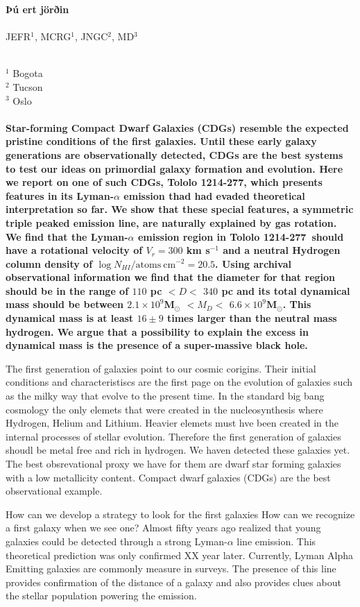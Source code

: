 \documentclass[a4paper, usenatbib, 12pt]{article}
\newcommand{\tol}{Tololo 1214-277}
\begin{document}
\pagestyle{empty}
\noindent
\textbf{Þú ert jörðin}
\\
\\
JEFR$^{1}$, MCRG$^1$, JNGC$^2$, MD$^3$
\\
\\
\scriptsize
{$^1$ Bogota
\\
$^2$ Tucson
\\
$^3$ Oslo
\normalsize
\\
\\
\textbf{
Star-forming Compact Dwarf Galaxies (CDGs) resemble the expected pristine conditions of the first galaxies.  
Until these early galaxy generations are observationally
detected, CDGs are the best systems to test our ideas on primordial
galaxy formation and evolution.  
Here we report on one of such CDGs, \tol, which presents
features in its Lyman-$\alpha$ emission thad had evaded theoretical
interpretation so far. 
We show that these special features, a symmetric triple peaked
emission line, are naturally explained by gas rotation.  
We find that the Lyman-$\alpha$ emission region in \tol\ should
have a rotational velocity of $V_{r}=300$ km s$^{-1}$ and a neutral
Hydrogen column density of $\log N_{HI} / \mathrm{atoms\ cm}^{-2} =
  20.5$.   
Using archival observational information we find that
the diameter for that region should be in the range of
$110$ pc $<D<$ $340$ pc and its total dynamical mass 
should be between $2.1\times 10^{9}$M$_{\odot}$ $<M_D<$  $6.6\times
10^{9}$M$_{\odot}$. 
This dynamical mass is at least $16\pm 9$ times
larger than the neutral mass hydrogen.
We argue that a possibility to explain the excess in
dynamical mass is the presence of a super-massive black hole. }



The first generation of galaxies point to our cosmic corigins. Their
initial conditions and characteristiscs are the first page on the
evolution of galaxies such as the milky way that evolve to the present
time. In the standard big bang cosmology the only elemets that were
created in the nucleosynthesis where Hydrogen, Helium and
Lithium. Heavier elemets must hve been created in the internal
processes of stellar evolution. Therefore the first generation of
galaxies shoudl be metal free and rich in hydrogen. We haven detected
these galaxies yet. The best obsrevational proxy we have for them are
dwarf star forming galaxies with a low metallicity content. Compact
dwarf galaxies (CDGs) are the best observational example.  

How can we develop a strategy to look for the first galaxies How can we recognize a first galaxy when we see one? 
Almost fifty years ago \cite{PartridgePeebles} realized that young
galaxies could be detected through a strong Lyman-$\alpha$ line
emission.  This theoretical prediction was only confirmed XX year
later.  Currently, Lyman Alpha Emitting galaxies are commonly measure
in surveys. 
The presence of this line provides confirmation of the distance of a
galaxy and also provides clues about the stellar population powering
the emission.

}
\end{document}
